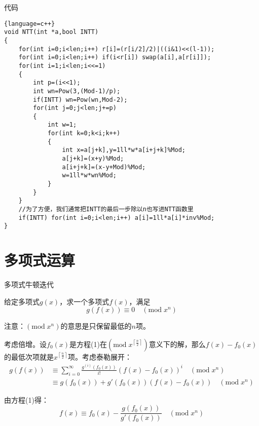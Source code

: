 \documentclass{beamer}
\begin{document}
\begin{frame}[fragile]{代码}
    \begin{lstlisting}{language=c++}
void NTT(int *a,bool INTT)
{
    for(int i=0;i<len;i++) r[i]=(r[i/2]/2)|((i&1)<<(l-1));
    for(int i=0;i<len;i++) if(i<r[i]) swap(a[i],a[r[i]]);
    for(int i=1;i<len;i<<=1)
    {
        int p=(i<<1);
        int wn=Pow(3,(Mod-1)/p);
        if(INTT) wn=Pow(wn,Mod-2);
        for(int j=0;j<len;j+=p)
        {
            int w=1;
            for(int k=0;k<i;k++)
            {
                int x=a[j+k],y=1ll*w*a[i+j+k]%Mod;
                a[j+k]=(x+y)%Mod;
                a[i+j+k]=(x-y+Mod)%Mod;
                w=1ll*w*wn%Mod;
            }
        }
    }
    //为了方便，我们通常把INTT的最后一步除以n也写进NTT函数里
    if(INTT) for(int i=0;i<len;i++) a[i]=1ll*a[i]*inv%Mod;
}
    \end{lstlisting}
\end{frame}

\section{多项式运算}

\begin{frame}{多项式牛顿迭代}

\small
给定多项式$g(x)$，求一个多项式$f(x)$，满足
\begin{equation}
    g(f(x))\equiv 0 \quad (\text{mod}\;x^n)
\end{equation}

注意：$(\text{mod}\;x^n)$的意思是只保留最低的$n$项。

\vspace{1em}\pause

考虑倍增。设$f_0(x)$是方程(1)在$(\text{mod}\;x^{\left\lceil\frac{n}{2}\right\rceil})$意义下的解，那么$f(x)-f_0(x)$的最低次项就是$x^{\left\lceil\frac{n}{2}\right\rceil}$项。考虑泰勒展开：
\begin{align*}
    g(f(x))&\equiv \sum_{i=0}^\infty \frac{g^{(i)}(f_0(x))}{i!}(f(x)-f_0(x))^i\quad (\text{mod}\;x^n)\\
    &\equiv g(f_0(x))+g'(f_0(x))(f(x)-f_0(x))\quad (\text{mod}\;x^n)
\end{align*}

\pause
由方程(1)得：
\begin{equation*}
    f(x)\equiv f_0(x) -\frac{g(f_0(x))}{g'(f_0(x))} \quad (\text{mod}\;x^n)
\end{equation*}

\end{frame}
\end{document}
